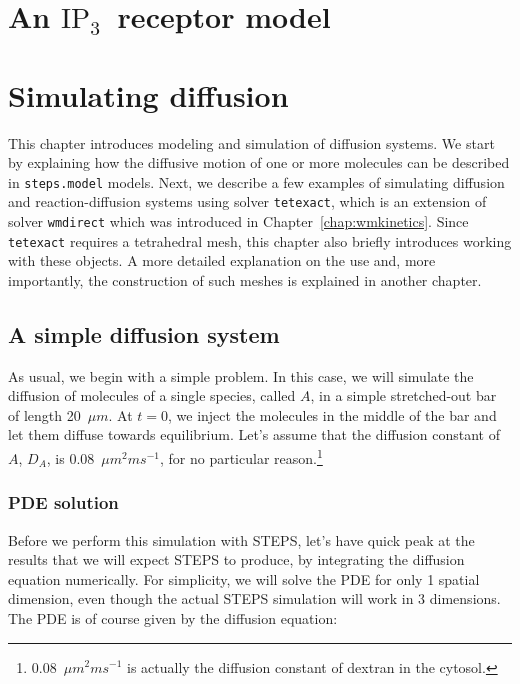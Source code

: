 \documentclass[a4paper,12pt]{book}
\newcommand{\inspt}[0]{\ensuremath{\textrm{IP}_3}}
\begin{document}
\chapter{An \inspt\ receptor model}

\chapter{Simulating diffusion}\label{chap:simulatingdiffusion}

This chapter introduces modeling and simulation of diffusion systems. We start by explaining how the diffusive motion of one or more molecules can be described in \texttt{steps.model} models. Next, we describe a few examples of simulating diffusion and reaction-diffusion systems using solver \texttt{tetexact}, which is an extension of solver \texttt{wmdirect} which was introduced in Chapter~\ref{chap:wmkinetics}. Since \texttt{tetexact} requires a tetrahedral mesh, this chapter also briefly introduces working with these objects. A more detailed explanation on the use and, more importantly, the construction of such meshes is explained in another chapter.

\section{A simple diffusion system}

As usual, we begin with a simple problem. In this case, we will simulate the diffusion of molecules of a single species, called $A$, in a simple stretched-out bar of length 20~$\mu m$. At $t=0$, we inject the molecules in the middle of the bar and let them diffuse towards equilibrium. Let's assume that the diffusion constant of $A$, $D_{A}$, is 0.08~$\mu m^{2}ms^{-1}$, for no particular reason.\footnote{0.08~$\mu m^{2}ms^{-1}$ is actually the diffusion constant of dextran in the cytosol.}

\subsection{PDE solution}

Before we perform this simulation with STEPS, let's have quick peak at the results that we will expect STEPS to produce, by integrating the diffusion equation numerically. For simplicity, we will solve the PDE for only 1 spatial dimension, even though the actual STEPS simulation will work in 3 dimensions. The PDE is of course given by the diffusion equation:
\end{document}
